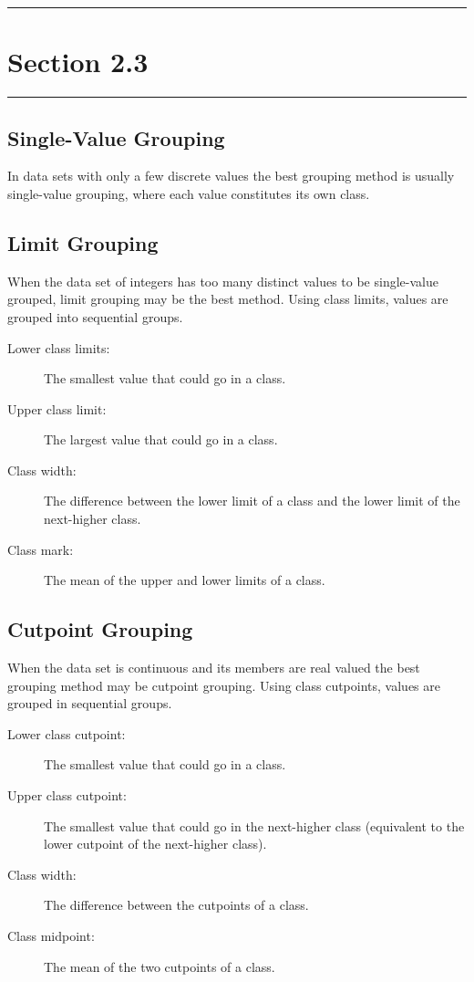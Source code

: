 \documentclass[12pt]{article}
\begin{document}
    \noindent\rule{\textwidth}{0.4pt}
    \section*{Section 2.3}
    \noindent\rule{\textwidth}{0.4pt}
        \subsection*{Single-Value Grouping}
            In data sets with only a few discrete values the best grouping method is usually
            single-value grouping, where each value constitutes its own class.
        \subsection*{Limit Grouping}
            When the data set of integers has too many distinct values to be single-value 
            grouped, limit grouping may be the best method. Using class limits, values are
            grouped into sequential groups.
            \begin{description}
                \item[Lower class limits:] The smallest value that could go in a class.
                \item[Upper class limit:] The largest value that could go in a class. 
                \item[Class width:] The difference between the lower limit of a class and
                the lower limit of the next-higher class.
                \item[Class mark:] The mean of the upper and lower limits of a class.
            \end{description}
        \subsection*{Cutpoint Grouping}
            When the data set is continuous and its members are real valued the best
            grouping method may be cutpoint grouping. Using class cutpoints, values are
            grouped in sequential  groups.
            \begin{description}
                \item[Lower class cutpoint:] The smallest value that could go in a class.
                \item[Upper class cutpoint:] The smallest value that could go in the
                next-higher class (equivalent to the lower cutpoint of the next-higher
                class).
                \item[Class width:] The difference between the cutpoints of a class.
                \item[Class midpoint:] The mean of the two cutpoints of a class.
            \end{description}
\end{document}
